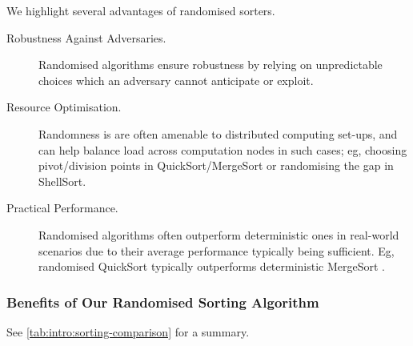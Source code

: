 \documentclass{article}
\begin{document}
We highlight several advantages of randomised sorters.

\begin{description}
\item 
[Robustness Against Adversaries.]
Randomised algorithms ensure robustness by relying on unpredictable choices which an adversary cannot anticipate or exploit.
%	


\item 
[Resource Optimisation.]
Randomness is are often amenable to distributed computing set-ups,
and can help balance load across computation nodes in such cases; eg,
	choosing pivot/division points in QuickSort/MergeSort
or
	randomising the gap in ShellSort.

\item 
[Practical Performance.]
Randomised algorithms often outperform deterministic ones in real-world scenarios due to their average performance typically being sufficient.
Eg, randomised QuickSort typically outperforms deterministic MergeSort \cite{S:algorithm-design-manual}.
\end{description}


\subsubsection*{Benefits of Our Randomised Sorting Algorithm}

See \cref{tab:intro:sorting-comparison} for a summary.
\end{document}
